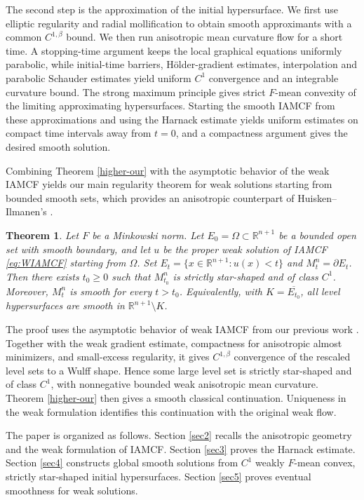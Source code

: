 \documentclass[10pt,a4paper]{amsart}
\newtheorem{theorem}[proposition]{Theorem}
\numberwithin{equation}{section}
\begin{document}
	The second step is the approximation of the initial hypersurface. We first use elliptic regularity and radial mollification to obtain smooth approximants with a common $C^{1,\beta}$ bound. We then run anisotropic mean curvature flow for a short time. A stopping-time argument keeps the local graphical equations uniformly parabolic, while initial-time barriers, H\"older-gradient estimates, interpolation and parabolic Schauder estimates yield uniform $C^1$ convergence and an integrable curvature bound. The strong maximum principle gives strict $F$-mean convexity of the limiting approximating hypersurfaces. Starting the smooth IAMCF from these approximations and using the Harnack estimate yields uniform estimates on compact time intervals away from $t=0$, and a compactness argument gives the desired smooth solution.
	
	Combining Theorem \ref{higher-our} with the asymptotic behavior of the weak IAMCF yields our main regularity theorem for weak solutions starting from bounded smooth sets, which provides an anisotropic counterpart of Huisken--Ilmanen's \cite[Theorem 2.7]{HI08}.
	
	\begin{theorem}
		\label{thm-main}
		Let $F$ be a Minkowski norm. Let $E_0=\Omega\subset\mathbb{R}^{n+1}$ be a bounded open set with smooth boundary, and let $u$ be the proper weak solution of IAMCF \eqref{eq:WIAMCF} starting from $\Omega$. Set $E_t=\{x\in\mathbb{R}^{n+1}:u(x)<t\}$ and $M_t^n=\partial E_t$. Then there exists $t_0\geq 0$ such that $M_{t_0}^n$ is strictly star-shaped and of class $C^1$. Moreover, $M_t^n$ is smooth for every $t>t_0$. Equivalently, with $K=\overline{E_{t_0}}$, all level hypersurfaces are smooth in $\mathbb{R}^{n+1}\setminus K$.
	\end{theorem}
	
	The proof uses the asymptotic behavior of weak IAMCF from our previous work \cite{GWZ26}. Together with the weak gradient estimate, compactness for anisotropic almost minimizers, and small-excess regularity, it gives $C^{1,\beta}$ convergence of the rescaled level sets to a Wulff shape. Hence some large level set is strictly star-shaped and of class $C^1$, with nonnegative bounded weak anisotropic mean curvature. Theorem \ref{higher-our} then gives a smooth classical continuation. Uniqueness in the weak formulation identifies this continuation with the original weak flow.

   The paper is organized as follows. Section \ref{sec2} recalls the anisotropic geometry and the weak formulation of IAMCF. Section \ref{sec3} proves the Harnack estimate. Section \ref{sec4} constructs global smooth solutions from $C^1$ weakly $F$-mean convex, strictly star-shaped initial hypersurfaces. Section \ref{sec5} proves eventual smoothness for weak solutions.
\end{document}
